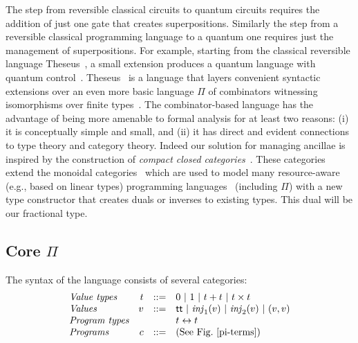 \documentclass[sigplan,10pt,review,anonymous]{acmart}
\newcommand{\alt}{~|~}
\newcommand{\inlv}[1]{\ensuremath{\mathit{inj}_1(#1)}}
\newcommand{\inrv}[1]{\ensuremath{\mathit{inj}_2(#1)}}
\begin{document}
The step from reversible classical circuits to quantum circuits
requires the addition of just one gate that creates
superpositions. Similarly the step from a reversible classical
programming language to a quantum one requires just the management of
superpositions. For example, starting from the classical reversible
language Theseus~\cite{james2014theseus}, a small extension produces a
quantum language with quantum
control~\cite{10.1007/978-3-319-89366-2_19}.
Theseus~\cite{james2014theseus} is a language that layers convenient
syntactic extensions over an even more basic language $\Pi$ of
combinators witnessing isomorphisms over finite
types~\cite{DBLP:conf/esop/CaretteS16}. The combinator-based language
has the advantage of being more amenable to formal analysis for at
least two reasons: (i) it is conceptually simple and small, and (ii)
it has direct and evident connections to type theory and category
theory. Indeed our solution for managing ancillae is inspired by the
construction of \emph{compact closed
  categories}~\cite{kelly1972many}. These categories extend the
monoidal
categories~\cite{benabou1963algebre,benabou1964algebre,maclane1963natural} which
are used to model many resource-aware (e.g., based on linear types) programming
languages~\cite{benton1994mixed,krishnaswami2015integrating}
(including $\Pi$) with a new type
constructor that creates duals or inverses to existing types. This
dual will be our fractional type.

\subsection{Core $\Pi$}
\label{sub:core}

The syntax of the language consists of several categories:
\[\begin{array}{lrcl}
\textit{Value types} & t &::=& 0 \alt 1 \alt t+t \alt t\times t \\
\textit{Values}      & v &::=& \textsf{tt} \alt \inlv{v} \alt \inrv{v} \alt (v,v) \\
\textit{Program types} &&& t \leftrightarrow t \\
\textit{Programs} & c &::=& (\textrm{See Fig.~\ref{pi-terms}})
\end{array}\]
\end{document}
